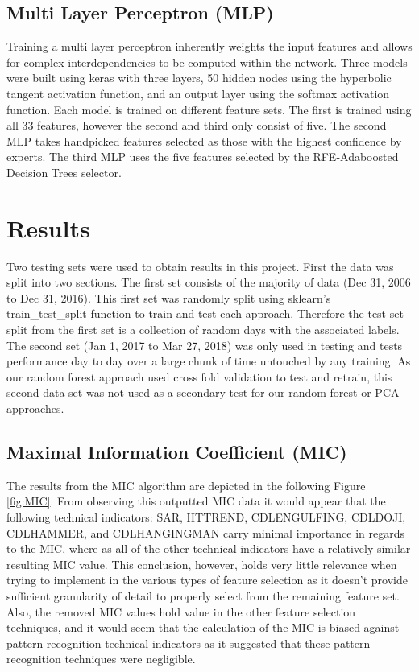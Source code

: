 \documentclass{article}\raggedbottom
\begin{document}
\subsection{Multi Layer Perceptron (MLP)}
Training a multi layer perceptron inherently weights the input features and allows for complex interdependencies to be computed within the network. Three models were built using keras with three layers, 50 hidden nodes using the hyperbolic tangent activation function, and an output layer using the softmax activation function. Each model is trained on different feature sets. The first is trained using all 33 features, however the second and third only consist of five. The second MLP takes handpicked features selected as those with the highest confidence by experts. The third MLP uses the five features selected by the RFE-Adaboosted Decision Trees selector.

\section{Results}
Two testing sets were used to obtain results in this project. First the data was split into two sections. The first set consists of the majority of data (Dec 31, 2006 to Dec 31, 2016). This first set was randomly split using sklearn's train\_test\_split function to train and test each approach. Therefore the test set split from the first set is a collection of random days with the associated labels. The second set (Jan 1, 2017 to Mar 27, 2018) was only used in testing and tests performance day to day over a large chunk of time untouched by any training. As our random forest approach used cross fold validation to test and retrain, this second data set was not used as a secondary test for our random forest or PCA approaches.

\subsection{Maximal Information Coefficient (MIC)}
The results from the MIC algorithm are depicted in the following Figure \ref{fig:MIC}. From observing this outputted MIC data it would appear that the following technical indicators: SAR, HT\textunderscore TREND, CDLENGULFING, CDLDOJI, CDLHAMMER, and CDLHANGINGMAN carry minimal importance in regards to the MIC, where as all of the other technical indicators have a relatively similar resulting MIC value. This conclusion, however, holds very little relevance when trying to implement in the various types of feature selection as it doesn't provide sufficient granularity of detail to properly select from the remaining feature set. Also, the removed MIC values hold value in the other feature selection techniques, and it would seem that the calculation of the MIC is biased against pattern recognition technical indicators as it suggested that these pattern recognition techniques were negligible.
\end{document}
